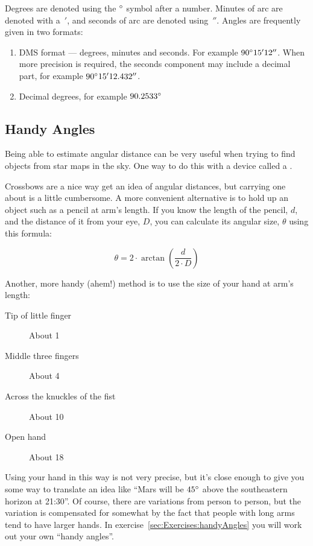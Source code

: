 Degrees are denoted using the $\degree$ symbol after a number. Minutes of arc are denoted with a~$'$, and seconds of arc are denoted using~$''$. Angles are frequently given in two formats:

\begin{enumerate}
\item
  DMS format --- degrees, minutes and seconds. For example $90\degree15'12''$.
  When more precision is required, the seconds component may include a
  decimal part, for example $90\degree15'12.432''$.
\item
  Decimal degrees, for example $90.2533\degree$
\end{enumerate}

\subsection{Handy Angles}
\label{sec:Concepts:Angles:HandyAngles}

Being able to estimate angular distance can be very useful when trying
to find objects from star maps in the sky. One way to do this with a
device called a .


Crossbows are a nice way get an idea of angular distances, but carrying
one about is a little cumbersome. A more convenient alternative is to
hold up an object such as a pencil at arm's length. If you know the
length of the pencil, $d$, and the distance of it from your eye, $D$, you
can calculate its angular size, $\theta$ using this formula:

\begin{equation}
\label{eq:handyAngle}
\theta=2 \cdot \arctan{\left(\frac{d}{2 \cdot D}\right) }
\end{equation}


\noindent Another, more handy (ahem!) method is to use the size of your hand at
arm's length:

\begin{description}
\item[Tip of little finger] About 1\degree 
\item[Middle three fingers] About 4\degree 
\item[Across the knuckles of the fist] About 10\degree 
\item[Open hand] About 18\degree
\end{description}

Using your hand in this way is not very precise, but it's close enough
to give you some way to translate an idea like ``Mars will be
$45\degree$ above the southeastern horizon at 21:30''. Of course,
there are variations from person to person, but the variation is
compensated for somewhat by the fact that people with long arms tend
to have larger hands. In exercise~\ref{sec:Exercises:handyAngles} you
will work out your own ``handy angles''.



